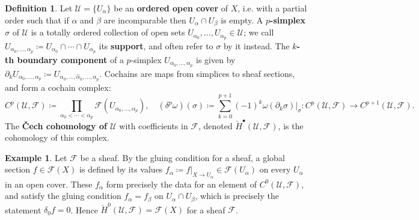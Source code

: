 \documentclass{report}
\theoremstyle{plain}
\theoremstyle{definition}
\newtheorem{definition}[theorem]{Definition}
\newtheorem{example}[theorem]{Example}
\theoremstyle{remark}
\newcommand{\di}{\partial}
\newcommand{\cF}{\mathcal{F}}
\newcommand{\cU}{\mathcal{U}}
\newcommand{\chH}{\check{H}}
\begin{document}
\begin{definition}
  Let $\cU = \{U_\alpha\}$ be an {\bf ordered open cover} of $X$, i.e.
  with a partial order such that if $\alpha$ and $\beta$ are
  incomparable then $U_\alpha \cap U_\beta$ is empty. A {\bf
    $p$-simplex} $\sigma$ of $\cU$ is a totally ordered collection of
  open sets $U_{\alpha_0}, \ldots, U_{\alpha_p} \in \cU$; we call
  $U_{\alpha_0, \ldots, \alpha_p} \coloneqq U_{\alpha_0} \cap \cdots
  \cap U_{\alpha_p}$ its {\bf support}, and often refer to $\sigma$ by
  it instead. The {\bf $k$-th boundary component} of a $p$-simplex
  $U_{\alpha_0, \ldots, \alpha_p}$ is given by $\di_k U_{\alpha_0,
    \ldots, \alpha_p} \coloneqq U_{\alpha_0, \ldots, \hat{\alpha}_k,
    \ldots, \alpha_p}$. Cochains are maps from simplices to sheaf
  sections, and form a cochain complex:
  \[ C^p(\cU, \cF) \coloneqq \prod_{\alpha_0 < \cdots < \alpha_p} \cF(U_{\alpha_0, \ldots, \alpha_p}), \quad (\delta^p \omega)(\sigma) \coloneqq \sum_{k=0}^{p+1} (-1)^k \omega(\di_k \sigma)|_{\sigma} \colon C^p(\cU, \cF) \to C^{p+1}(\cU, \cF). \]
  The {\bf \v Cech cohomology of $\cU$} with coefficients in $\cF$,
  denoted $\chH^\bullet(\cU, \cF)$, is the cohomology of this complex.
\end{definition}

\begin{example}
  Let $\cF$ be a sheaf. By the gluing condition for a sheaf, a global
  section $f \in \cF(X)$ is defined by its values $f_\alpha \coloneqq
  f|_{X \to U_\alpha} \in \cF(U_\alpha)$ on every $U_\alpha$ in an
  open cover. These $f_\alpha$ form precisely the data for an element
  of $C^0(\cU, \cF)$, and satisfy the gluing condition $f_\alpha =
  f_\beta$ on $U_\alpha \cap U_\beta$, which is precisely the
  statement $\delta_0 f = 0$. Hence $\chH^0(\cU, \cF) = \cF(X)$ for a
  sheaf $\cF$.
\end{example}
\end{document}
